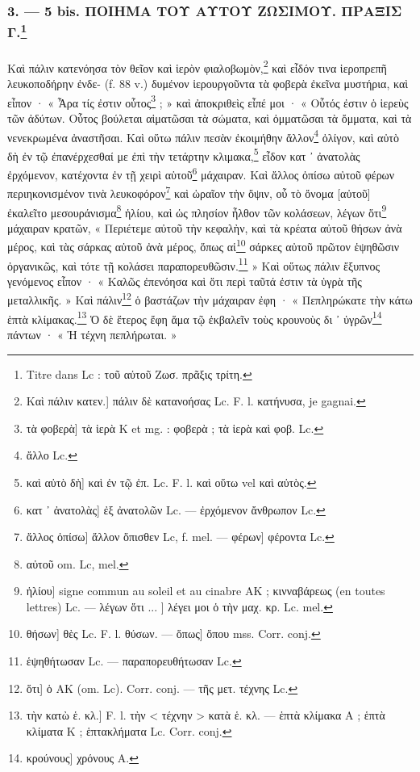\documentclass[a4paper, 11pt, oneside, polutonikogreek, french]{article}
\begin{document}
\subsubsection[3. --- 5 bis. ΠΟΙΗΜΑ ΤΟΥ ΑΥΤΟΥ ΖΩΣΙΜΟΥ. ΠΡΑΞΙΣ Γ.]{3. --- 5 bis. ΠΟΙΗΜΑ ΤΟΥ ΑΥΤΟΥ ΖΩΣΙΜΟΥ. ΠΡΑΞΙΣ Γ.\footnote{Titre dans Lc : τοῦ αὐτοῦ Ζωσ. πρᾶξις τρίτη.}}
\paragraph{}
Καὶ πάλιν κατενόησα τὸν θεῖον καὶ ἱερὸν φιαλοβωμὸν,\footnote{Καὶ πάλιν κατεν.] πάλιν δὲ κατανοήσας Lc. F. l. κατήνυσα, je gagnai.} καὶ εἶδόν τινα ἱεροπρεπῆ λευκοποδήρην ἐνδε- (f. 88 v.) δυμένον ἱερουργοῦντα τὰ φοβερὰ ἐκεῖνα μυστήρια, καὶ εἶπον · « Ἆρα τίς ἐστιν οὗτος\footnote{τὰ φοβερὰ] τὰ ἱερὰ K et mg. : φοβερὰ ; τὰ ἱερὰ καὶ φοβ. Lc.} ; » καὶ ἀποκριθεὶς εἶπέ μοι · « Οὗτός ἐστιν ὁ ἱερεὺς τῶν ἀδύτων. Οὗτος βούλεται αἱματῶσαι τὰ σώματα, καὶ ὀμματῶσαι τὰ ὄμματα, καὶ τὰ νενεκρωμένα ἀναστῆσαι. Καὶ οὕτω πάλιν πεσὰν ἐκοιμήθην ἄλλον\footnote{ἄλλο Lc.} ὀλίγον, καὶ αὐτὸ δὴ ἐν τῷ ἐπανέρχεσθαί με ἐπὶ τὴν τετάρτην κλιμακα,\footnote{καὶ αὐτὸ δὴ] καὶ ἐν τῷ ἐπ. Lc. F. l. καὶ οὕτω vel καὶ αὐτὸς.} εἶδον κατ ᾽ ἀνατολὰς ἐρχόμενον, κατέχοντα ἐν τῇ χειρὶ αὑτοῦ\footnote{κατ ᾽ ἀνατολὰς] ἐξ ἀνατολῶν Lc. --- ἐρχόμενον ἄνθρωπον Lc.} μάχαιραν. Καὶ ἄλλος ὀπίσω αὐτοῦ φέρων περιηκονισμένον τινὰ λευκοφόρον\footnote{ἄλλος ὀπίσω] ἄλλον ὄπισθεν Lc, f. mel. --- φέρων] φέροντα Lc.} καὶ ὡραῖον τὴν ὄψιν, οὗ τὸ ὄνομα [αὐτοῦ] ἐκαλεῖτο μεσουράνισμα\footnote{αὐτοῦ om. Lc, mel.} ἡλίου, καὶ ὡς πλησίον ἦλθον τῶν κολάσεων, λέγων ὅτι\footnote{ἡλίου] signe commun au soleil et au cinabre AK ; κινναβάρεως (en toutes lettres) Lc. --- λέγων ὅτι ... ] λέγει μοι ὁ τὴν μαχ. κρ. Lc. mel.} μάχαιραν κρατῶν, « Περιέτεμε αὐτοῦ τὴν κεφαλὴν, καὶ τὰ κρέατα αὐτοῦ θήσων ἀνὰ μέρος, καὶ τὰς σάρκας αὐτοῦ ἀνὰ μέρος, ὅπως αἱ\footnote{θήσων] θὲς Lc. F. l. θύσων. --- ὅπως] ὅπου mss. Corr. conj.} σάρκες αὐτοῦ πρῶτον ἑψηθῶσιν ὀργανικῶς, καὶ τότε τῇ κολάσει παραπορευθῶσιν.\footnote{ἑψηθήτωσαν Lc. --- παραπορευθήτωσαν Lc.} » Καὶ οὕτως πάλιν ἔξυπνος γενόμενος εἶπον · « Καλῶς ἐπενόησα καὶ ὅτι περὶ ταῦτά ἐστιν τὰ ὑγρὰ τῆς μεταλλικῆς. » Καὶ πάλιν\footnote{ὅτι] ὁ AK (om. Lc). Corr. conj. --- τῆς μετ. τέχνης Lc.} ὁ βαστάζων τὴν μάχαιραν ἐφη · « Πεπληρώκατε τὴν κάτω ἑπτὰ κλίμακας.\footnote{τὴν κατὼ ἑ. κλ.] F. l. τὴν < τέχνην > κατὰ ἑ. κλ. --- ἑπτὰ κλίμακα A ; ἑπτὰ κλίματα K ; ἑπτακλήματα Lc. Corr. conj.} Ὁ δὲ ἕτερος ἔφη ἅμα τῷ ἐκβαλεῖν τοὺς κρουνοὺς δι ᾽ ὑγρῶν\footnote{κρούνους] χρόνους A.} πάντων · « Ἡ τέχνη πεπλήρωται. »
\end{document}
